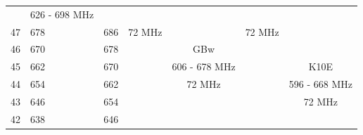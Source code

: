 \begin{longtable}[H]{|p{1cm}|p{1cm}|p{1cm}|cc|cc|}
                   &
                  \multicolumn{1}{c|}{\cellcolor[HTML]{FCFF2F}626 - 698 MHz} &
                   \\ \cline{1-3}
                \cellcolor[HTML]{9AFF99}47 &
                  \cellcolor[HTML]{9AFF99}678 &
                  \cellcolor[HTML]{9AFF99}686 &
                  \multicolumn{1}{c|}{\cellcolor[HTML]{FCFF2F}72 MHz} &
                   &
                  \multicolumn{1}{c|}{\cellcolor[HTML]{FCFF2F}72 MHz} &
                   \\ \cline{1-3} \cline{5-5}
                \cellcolor[HTML]{9AFF99}46 &
                  \cellcolor[HTML]{9AFF99}670 &
                  \cellcolor[HTML]{9AFF99}678 &
                  \multicolumn{1}{c|}{\cellcolor[HTML]{FCFF2F}} &
                  \cellcolor[HTML]{F8A102}GBw &
                  \multicolumn{1}{c|}{\cellcolor[HTML]{FCFF2F}} &
                   \\ \cline{1-3} \cline{7-7} 
                \cellcolor[HTML]{9AFF99}45 &
                  \cellcolor[HTML]{9AFF99}662 &
                  \cellcolor[HTML]{9AFF99}670 &
                  \multicolumn{1}{c|}{\cellcolor[HTML]{FCFF2F}} &
                  \cellcolor[HTML]{F8A102}606 - 678 MHz &
                  \multicolumn{1}{c|}{\cellcolor[HTML]{FCFF2F}} &
                  \cellcolor[HTML]{F8A102}K10E \\ \cline{1-3}
                \cellcolor[HTML]{9AFF99}44 &
                  \cellcolor[HTML]{9AFF99}654 &
                  \cellcolor[HTML]{9AFF99}662 &
                  \multicolumn{1}{c|}{\cellcolor[HTML]{FCFF2F}} &
                  \cellcolor[HTML]{F8A102}72 MHz &
                  \multicolumn{1}{c|}{\cellcolor[HTML]{FCFF2F}} &
                  \cellcolor[HTML]{F8A102}596 - 668 MHz \\ \cline{1-3}
                \cellcolor[HTML]{9AFF99}43 &
                  \cellcolor[HTML]{9AFF99}646 &
                  \cellcolor[HTML]{9AFF99}654 &
                  \multicolumn{1}{c|}{\cellcolor[HTML]{FCFF2F}} &
                  \cellcolor[HTML]{F8A102} &
                  \multicolumn{1}{c|}{\cellcolor[HTML]{FCFF2F}} &
                  \cellcolor[HTML]{F8A102}72 MHz \\ \cline{1-3}
                \cellcolor[HTML]{9AFF99}42 &
                  \cellcolor[HTML]{9AFF99}638 &
                  \cellcolor[HTML]{9AFF99}646 &
                  \multicolumn{1}{c|}{\cellcolor[HTML]{FCFF2F}} &
                  \cellcolor[HTML]{F8A102} &
                  \multicolumn{1}{c|}{\cellcolor[HTML]{FCFF2F}} &
                  \cellcolor[HTML]{F8A102} \\ \cline{1-3}

\end{longtable}
